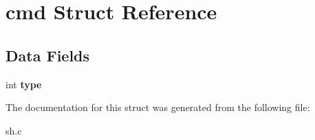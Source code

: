 \hypertarget{structcmd}{}\section{cmd Struct Reference}
\label{structcmd}
\subsection*{Data Fields}
\begin{DoxyCompactItemize}
\item 
int {\bfseries type}\hypertarget{structcmd_a9b861866e1dec63e694247fb4d976423}{}\label{structcmd_a9b861866e1dec63e694247fb4d976423}

\end{DoxyCompactItemize}


The documentation for this struct was generated from the following file\+:\begin{DoxyCompactItemize}
\item 
sh.\+c\end{DoxyCompactItemize}
